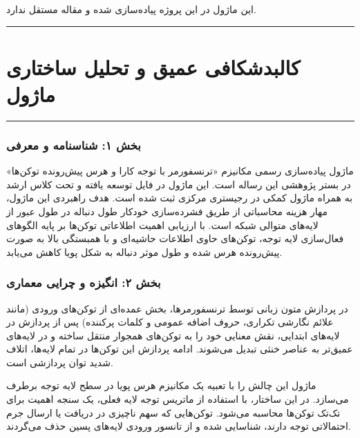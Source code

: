 \clearpage
{}
\vspace*{0.2cm}

این ماژول در این پروژه پیاده‌سازی شده و مقاله مستقل ندارد.
\noindent\rule{\textwidth}{1.2pt}
\vspace*{0.1cm}
\section{کالبدشکافی عمیق و تحلیل ساختاری ماژول }
\label{sec:mod_eat_attention}
\vspace*{-0.2cm}
\noindent\rule{\textwidth}{0.5pt}
\vspace*{0.3cm}

\subsubsection*{بخش ۱: شناسنامه و معرفی }
ماژول  پیاده‌سازی رسمی مکانیزم «ترنسفورمر با توجه کارا و هرس پیش‌رونده توکن‌ها»  در بستر پژوهشی این رساله است. این ماژول در فایل  توسعه یافته و تحت کلاس ارشد  به همراه ماژول کمکی  در رجیستری مرکزی ثبت شده است.
هدف راهبردی این ماژول، مهار هزینه محاسباتی از طریق فشرده‌سازی خودکار طول دنباله در طول عبور از لایه‌های متوالی شبکه است. با ارزیابی اهمیت اطلاعاتی توکن‌ها بر پایه الگوهای فعال‌سازی لایه توجه، توکن‌های حاوی اطلاعات حاشیه‌ای و با همبستگی بالا به صورت پیش‌رونده هرس شده و طول موثر دنباله به شکل پویا کاهش می‌یابد.

\subsubsection*{بخش ۲: انگیزه و چرایی معماری }
در پردازش متون زبانی توسط ترنسفورمرها، بخش عمده‌ای از توکن‌های ورودی (مانند علائم نگارشی تکراری، حروف اضافه عمومی و کلمات پرکننده) پس از پردازش در لایه‌های ابتدایی، نقش معنایی خود را به توکن‌های همجوار منتقل ساخته و در لایه‌های عمیق‌تر به عناصر خنثی تبدیل می‌شوند. ادامه پردازش این توکن‌ها در تمام لایه‌ها، اتلاف شدید توان پردازشی است.

ماژول  این چالش را با تعبیه یک مکانیزم هرس پویا در سطح لایه توجه برطرف می‌سازد. در این ساختار، با استفاده از ماتریس توجه لایه فعلی، یک سنجه اهمیت  برای تک‌تک توکن‌ها محاسبه می‌شود. توکن‌هایی که سهم ناچیزی در دریافت یا ارسال جرم احتمالاتی توجه دارند، شناسایی شده و از تانسور ورودی لایه‌های پسین حذف می‌گردند.

